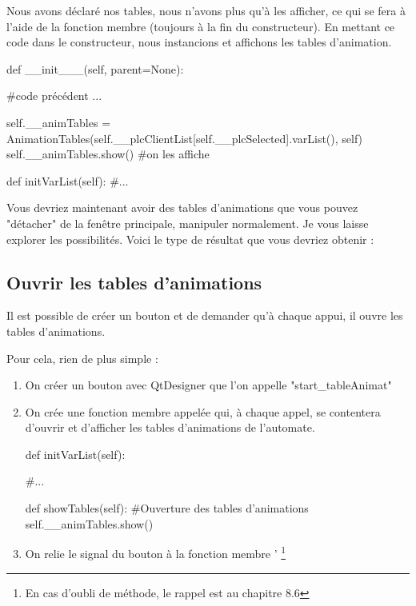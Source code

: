 {Nous avons déclaré nos tables, nous n'avons plus qu'à les afficher, ce qui se fera à l'aide de la fonction membre  (toujours à la fin du constructeur).
En mettant ce code dans le constructeur, nous instancions et affichons les tables d'animation.
\begin{Python}

def __init___(self, parent=None):

    #code précédent ...
    
    self.__animTables = AnimationTables(self.__plcClientList[self.__plcSelected].varList(), self)
    self.__animTables.show() #on les affiche
    
def initVarList(self):
    #...
\end{Python}



Vous devriez maintenant avoir des tables d'animations que vous pouvez "détacher" de la fenêtre principale, manipuler normalement. Je vous laisse explorer les possibilités.\newline
Voici le type de résultat que vous devriez obtenir :


\subsection{Ouvrir les tables d'animations}

Il est possible de créer un bouton et de demander qu'à chaque appui, il ouvre les tables d'animations.

Pour cela, rien de plus simple :

\begin{enumerate}
    \item On créer un bouton avec QtDesigner que l'on appelle "start\_tableAnimat"
    \item On crée une fonction membre appelée  qui, à chaque appel, se contentera d'ouvrir et d'afficher les tables d'animations de l'automate.
    
    \begin{Python}
        def initVarList(self):
        
            #...
        
        def showTables(self):
            #Ouverture des tables d'animations
            self.__animTables.show()
    \end{Python}
    \item On relie le signal du bouton à la fonction membre  ' \footnote{En cas d'oubli de méthode, le rappel est au chapitre 8.6}
    

\end{enumerate}}
